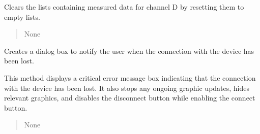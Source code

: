 \documentclass[letterpaper,10pt,english]{sphinxmanual}
\begin{document}
\begin{fulllineitems}
\begin{fulllineitems}
\begin{quote}
\begin{description}
\end{description}\end{quote}

\end{fulllineitems}


\begin{fulllineitems}
\label{\detokenize{StartStopHist:StartStopHist.StartStopLogic.clear_d}}
\pysigstartsignatures
{}
\pysigstopsignatures
\sphinxAtStartPar
Clears the lists containing measured data for channel D by resetting them to empty lists.
\begin{quote}\begin{description}
\sphinxAtStartPar
None

\end{description}\end{quote}

\end{fulllineitems}


\begin{fulllineitems}
\label{\detokenize{StartStopHist:StartStopHist.StartStopLogic.createDialog}}
\pysigstartsignatures
{}
\pysigstopsignatures
\sphinxAtStartPar
Creates a dialog box to notify the user when the connection with the device has been lost.

\sphinxAtStartPar
This method displays a critical error message box indicating that the connection with the device
has been lost. It also stops any ongoing graphic updates, hides relevant graphics, 
and disables the disconnect button while enabling the connect button.
\begin{quote}\begin{description}
\sphinxAtStartPar
None

\end{description}\end{quote}

\end{fulllineitems}



\end{fulllineitems}
\end{document}
